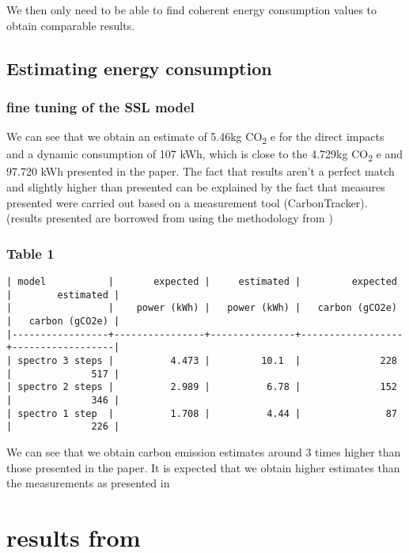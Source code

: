 \documentclass[11pt]{article}
\begin{document}
We then only need to be able to find coherent energy consumption
values to obtain comparable results.

\subsection{Estimating energy consumption}
\label{sec:org700bd55}

\subsubsection{fine tuning of the SSL model}
\label{sec:org744f98d}

We can see that we obtain an estimate of 5.46kg CO\textsubscript{2} e for the direct
impacts and a dynamic consumption of 107 kWh, which is close to the
4.729kg CO\textsubscript{2} e and 97.720 kWh presented in the paper. The fact that
results aren't a perfect match and slightly higher than presented can
be explained by the fact that measures presented were carried out
based on a measurement tool (CarbonTracker). (results presented are
borrowed from \cite{Evain2021task} using the methodology from \cite{parcollet2021energy})

\subsubsection{Table 1}
\label{sec:orga89eab1}

\begin{verbatim}
| model           |       expected |     estimated |         expected |        estimated |
|                 |    power (kWh) |   power (kWh) |   carbon (gCO2e) |   carbon (gCO2e) |
|-----------------+----------------+---------------+------------------+------------------|
| spectro 3 steps |          4.473 |         10.1  |              228 |              517 |
| spectro 2 steps |          2.989 |          6.78 |              152 |              346 |
| spectro 1 step  |          1.708 |          4.44 |               87 |              226 |
\end{verbatim}


We can see that we obtain carbon emission estimates around 3 times higher than
those presented in the paper. It is expected that we obtain higher
estimates than the measurements as presented in \cite{Jay2023experimental}

\section{results from \cite{Cattan2022benchmarking}}
\label{sec:org6b20743}
\end{document}
